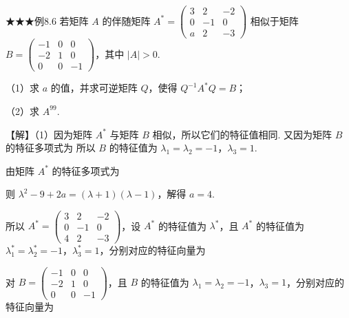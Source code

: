 \begin{fcard}{★★★例8.6}
若矩阵 $A$ 的伴随矩阵 $A^{*}=\begin{pmatrix}3&2&-2\\0&-1&0\\a&2&-3\end{pmatrix}$ 相似于矩阵 $B=\begin{pmatrix}-1&0&0\\-2&1&0\\0&0&-1\end{pmatrix}$，其中 $|A|>0$.

（1）求 $a$ 的值，并求可逆矩阵 $Q$，使得 $Q^{-1}A^{*}Q=B$；

（2）求 $A^{99}$.

【解】（1）因为矩阵 $A^{*}$ 与矩阵 $B$ 相似，所以它们的特征值相同. 又因为矩阵 $B$ 的特征多项式为
所以 $B$ 的特征值为 $\lambda_1=\lambda_2=-1$，$\lambda_3=1$.

由矩阵 $A^{*}$ 的特征多项式为

则 $\lambda^2-9+2a=(\lambda+1)(\lambda-1)$，解得 $a=4$.

所以 $A^{*}=\begin{pmatrix}3&2&-2\\0&-1&0\\4&2&-3\end{pmatrix}$，设 $A^{*}$ 的特征值为 $\lambda^{*}$，且 $A^{*}$ 的特征值为 $\lambda_1^{*}=\lambda_2^{*}=-1$，$\lambda_3^{*}=1$，分别对应的特征向量为

对 $B=\begin{pmatrix}-1&0&0\\-2&1&0\\0&0&-1\end{pmatrix}$，且 $B$ 的特征值为 $\lambda_1=\lambda_2=-1$，$\lambda_3=1$，分别对应的特征向量为


\end{fcard}
